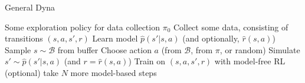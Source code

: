 \begin{algorithm}[t!]
\caption{General Dyna}
\begin{algorithmic}[1]
\label{alg:dynagen}
\REQUIRE Some exploration policy for data collection $\pi_0$
\STATE Collect some data, consisting of transitions $(s,a,s',r)$
\STATE Learn model $\hat{p}(s'|s,a)$ (and optionally, $\hat{r}(s,a)$)
\STATE Sample $s\sim \mathcal{B}$ from buffer
\STATE Choose action $a$ (from $\mathcal{B}$, from $\pi$, or random)
\STATE Simulate $s'\sim\hat{p}(s'|s,a)$ (and $r=\hat{r}(s,a)$)
\STATE Train on $(s,a,s',r)$ with model-free RL
\STATE (optional) take $N$ more model-based steps
\ENDFOR
\end{algorithmic}
\end{algorithm}